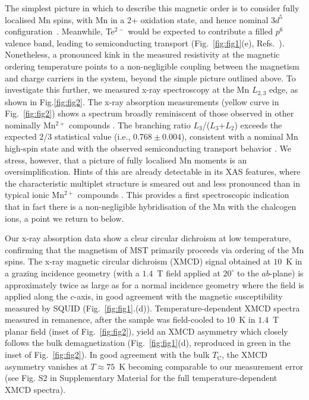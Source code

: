 \documentclass[preprint,amsmath,amssymb,aps,nofootinbib,superscriptaddress]{revtex4-2}
\begin{document}
The simplest picture in which to describe this magnetic order is to consider fully localised Mn spins, with Mn in a 2+ oxidation state, and hence nominal $3d^5$ configuration~\cite{MRSAdv2019Martinez,APL2020Martinez}. Meanwhile, Te$^{2-}$ would be expected to contribute a filled $p^6$ valence band, leading to semiconducting transport (Fig.~\ref{fig:fig1}(e), Refs.~\cite{PRB2017May,PRB2018Liu,PRB2021Ni,PRB2022Wang}). Nonetheless, a pronounced kink in the measured resistivity at the magnetic ordering temperature points to a non-negligible coupling between the magnetism and charge carriers in the system, beyond the simple picture outlined above. To investigate this further, we measured x-ray spectroscopy at the Mn $L_{2,3}$ edge, as shown in Fig.\ref{fig:fig2}. The x-ray absorption measurements (yellow curve in Fig.~\ref{fig:fig2}) shows a spectrum broadly reminiscent of those observed in other nominally Mn$^{2+}$ compounds \cite{APL2000Ohldag,APL2004Edmonds}. The branching ratio $L_3$/($L_3$+$L_2$) exceeds the expected $2/3$ statistical value (i.e., $0.768\pm0.004$), consistent with a nominal Mn high-spin state and with the observed semiconducting transport behavior \cite{PRB1988Thole,PRB1997Durr}. We stress, however, that a picture of fully localised Mn moments is an oversimplification. Hints of this are already detectable in its XAS features, where the characteristic multiplet structure is smeared out and less pronounced than in typical ionic Mn$^{2+}$ compounds \cite{PRB2022Fujii}. This provides a first spectroscopic indication that in fact there is a non-negligible hybridisation of the Mn with the chalcogen ions, a point we return to below. 

Our x-ray absorption data show a clear circular dichroism at low temperature, confirming that the magnetism of MST primarily proceeds via ordering of the Mn spins. The x-ray magnetic circular dichroism (XMCD) signal obtained at $10$~K in a grazing incidence geometry (with a $1.4$~T field applied at $20^\circ$ to the $ab$-plane) is approximately twice as large as for a normal incidence geometry where the field is applied along the $c$-axis, in good agreement with the magnetic susceptibility measured by SQUID (Fig.~\ref{fig:fig1}.(d)). Temperature-dependent XMCD spectra measured in remanence, after the sample was field-cooled to $10$~K in $1.4$~T planar field (inset of Fig.~\ref{fig:fig2}), yield an XMCD asymmetry which closely follows the bulk demagnetization (Fig.~\ref{fig:fig1}(d), reproduced in green in the inset of Fig.~\ref{fig:fig2}). In good agreement with the bulk $T_\mathrm{C}$, the XMCD asymmetry vanishes at $T\approx75$~K becoming comparable to our measurement error (see Fig. S2 in Supplementary Material for the full temperature-dependent XMCD spectra).
\end{document}
